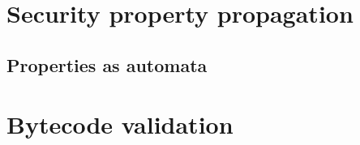 \section{Security property propagation}\label{sec:highlevel}



%

%
%
\subsection{Properties as automata}


\section{Bytecode validation}






%

%

